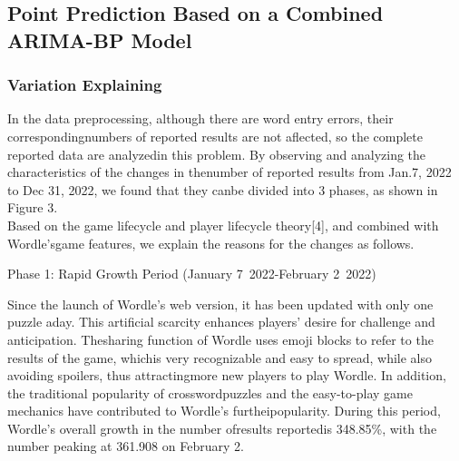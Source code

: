 \documentclass[12pt]{ctexart}
\begin{document}
\subsection{Point Prediction Based on a Combined ARIMA-BP Model}
\subsubsection{Variation Explaining}
In the data preprocessing, although there are word entry errors, their correspondingnumbers of reported results are not aflected, so the complete reported data are analyzedin this problem. By observing and analyzing the characteristics of the changes in thenumber of reported results from Jan.7, 2022 to Dec 31, 2022, we found that they canbe divided into 3 phases, as shown in Figure 3.
\\
Based on the game lifecycle and player lifecycle theory[4], and combined with Wordle'sgame features, we explain the reasons for the changes as follows.

\raisebox{-0.8ex}{\scalebox{2.2}{\textbullet}}\hspace{0.5em} Phase 1: Rapid Growth Period (January 7\, 2022-February 2\, 2022)

Since the launch of Wordle's web version, it has been updated with only one puzzle aday. This artificial scarcity enhances players' desire for challenge and anticipation. Thesharing function of Wordle uses emoji blocks to refer to the results of the game, whichis very recognizable and easy to spread, while also avoiding spoilers, thus attractingmore new players to play Wordle. In addition, the traditional popularity of crosswordpuzzles and the easy-to-play game mechanics have contributed to Wordle's furtheipopularity. During this period, Wordle's overall growth in the number ofresults reportedis 348.85\%, with the number peaking at 361.908 on February 2.

\end{document}

